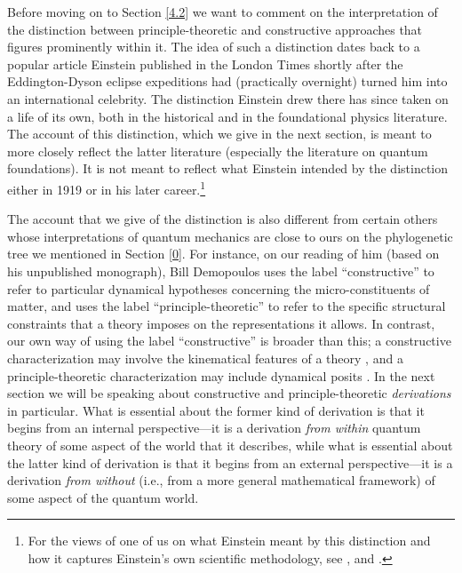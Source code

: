 Before moving on to Section \ref{4.2} we want to comment on the interpretation of the distinction between principle-theoretic and constructive approaches that figures prominently within it. The idea of such a distinction dates back to a popular article Einstein published in the London Times \citep{Einstein 1919} shortly after the Eddington-Dyson eclipse expeditions had (practically overnight) turned him into an international celebrity. The distinction Einstein drew there has since taken on a life of its own, both in the historical and in the foundational physics literature. The account of this distinction, which we give in the next section, is meant to more closely reflect the latter literature (especially the literature on quantum foundations). It is not meant to reflect what Einstein intended by the distinction either in 1919 or in his later career.\footnote{For the views of one of us on what Einstein meant by this distinction and how it captures Einstein's own scientific methodology, see \citet[sec.\ 3.5, pp.\ 38--41]{Janssen 2009}, \citet[p.\ 16, pp.\ 26--28]{Janssen and Lehner 2014} and \citet[Ch.\ 3, especially p.\ 102 and pp.\ 119--120]{Duncan and Janssen 2019}.}

The account that we give of the distinction is also different from certain others whose interpretations of quantum mechanics are close to ours on the phylogenetic tree we mentioned in Section \ref{0}. For instance, on our reading of him (based on his unpublished monograph), Bill Demopoulos uses the label ``constructive'' to refer to particular dynamical hypotheses concerning the micro-constituents of matter, and uses the label ``principle-theoretic'' to refer to the specific structural constraints that a theory imposes on the representations it allows. In contrast, our own way of using the label ``constructive'' is broader than this; a constructive characterization may involve the kinematical features of a theory \citep[cf.][]{Janssen 2009}, and a principle-theoretic characterization may include dynamical posits \citep[see][especially Section 12.4]{Koberinski and Mueller 2018}. In the next section we will be speaking about constructive and principle-theoretic \emph{derivations} in particular. What is essential about the former kind of derivation is that it begins from an internal perspective---it is a derivation \emph{from within} quantum theory of some aspect of the world that it describes, while what is essential about the latter kind of derivation is that it begins from an external perspective---it is a derivation \emph{from without} (i.e., from a more general mathematical framework) of some aspect of the quantum world.

